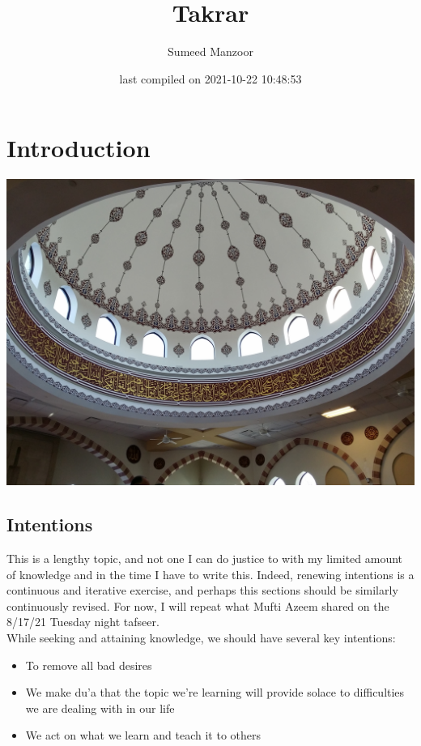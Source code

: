 \documentclass[
]{book}
\title{Takrar}
\author{Sumeed Manzoor}
\date{last compiled on 2021-10-22 10:48:53}
\providecommand{\tightlist}{%
  \setlength{\itemsep}{0pt}\setlength{\parskip}{0pt}}
\begin{document}
\maketitle

{
\setcounter{tocdepth}{1}
\tableofcontents
}
\hypertarget{intro}{%
\chapter{Introduction}\label{intro}}

\includegraphics{images/ds2.jpg}

\hypertarget{intent}{%
\section{Intentions}\label{intent}}

This is a lengthy topic, and not one I can do justice to with my limited amount of knowledge and in the time I have to write this. Indeed, renewing intentions is a continuous and iterative exercise, and perhaps this sections should be similarly continuously revised. For now, I will repeat what Mufti Azeem shared on the 8/17/21 Tuesday night tafseer.\\
While seeking and attaining knowledge, we should have several key intentions:

\begin{itemize}
\tightlist
\item
  To remove all bad desires
\item
  We make du'a that the topic we're learning will provide solace to difficulties we are dealing with in our life
\item
  We act on what we learn and teach it to others
\end{itemize}
\end{document}
